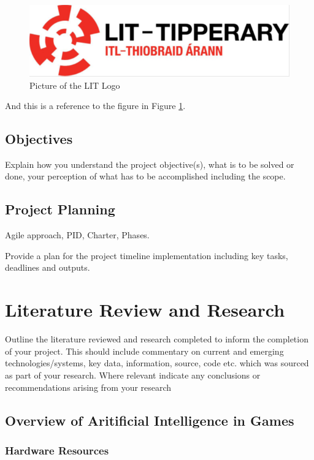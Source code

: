 \documentclass[12pt,a4paper,titlepage]{article}
\begin{document}
\begin{figure}[H]
	\centering
    	\includegraphics[width=\textwidth]{Figures/lit_logo}
	\caption{Picture of the LIT Logo}
	\label{fig:example figure and caption}
\end{figure}

And this is a reference to the figure in Figure \ref{fig:example figure and caption}.

\subsection{Objectives}
Explain how you understand the project objective(s), what is to be solved or done, your perception of what has to be accomplished including the scope. 

\subsection{Project Planning}
Agile approach, PID, Charter, Phases.

Provide a plan for the project timeline implementation including key tasks, deadlines and outputs.

\section{Literature Review and Research}
Outline the literature reviewed and research completed to inform the completion of your project.  This should include commentary on current and emerging technologies/systems, key data, information, source, code etc. which was sourced as part of your research.  Where relevant indicate any conclusions or recommendations arising from your research

\subsection{Overview of Aritificial Intelligence in Games}

\subsubsection{Hardware Resources}
\end{document}
